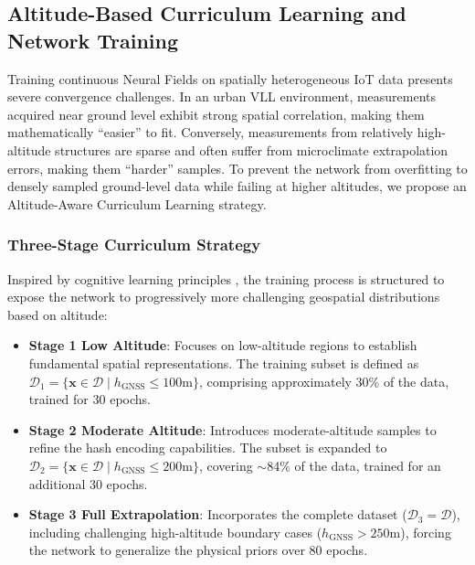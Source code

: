 \subsection{Altitude-Based Curriculum Learning and Network Training}
\label{subsec:curriculum_learning}
Training continuous Neural Fields on spatially heterogeneous IoT data presents severe convergence challenges. 
In an urban VLL environment, measurements acquired near ground level exhibit strong spatial correlation, making them mathematically ``easier'' to fit. 
Conversely, measurements from relatively high-altitude structures are sparse and often suffer from microclimate extrapolation errors, making them ``harder'' samples. To prevent the network from overfitting to densely sampled ground-level data while failing at higher altitudes, we propose an Altitude-Aware Curriculum Learning strategy.

\subsubsection{Three-Stage Curriculum Strategy}
Inspired by cognitive learning principles \cite{bengio2009curriculum}, the training process is structured to expose the network to progressively more challenging geospatial distributions based on altitude:
\begin{itemize}
    \item \textbf{Stage 1 Low Altitude}: Focuses on low-altitude regions to establish fundamental spatial representations. The training subset is defined as $\mathcal{D}_1 = \{ \mathbf{x} \in \mathcal{D} \mid h_{\text{GNSS}} \le 100\text{m} \}$, comprising approximately 30\% of the data, trained for 30 epochs.
    \item \textbf{Stage 2 Moderate Altitude}: Introduces moderate-altitude samples to refine the hash encoding capabilities. The subset is expanded to $\mathcal{D}_2 = \{ \mathbf{x} \in \mathcal{D} \mid h_{\text{GNSS}} \le 200\text{m} \}$, covering $\sim$84\% of the data, trained for an additional 30 epochs.
    \item \textbf{Stage 3 Full Extrapolation}: Incorporates the complete dataset ($\mathcal{D}_3 = \mathcal{D}$), including challenging high-altitude boundary cases ($h_{\text{GNSS}} > 250$m), forcing the network to generalize the physical priors over 80 epochs.
\end{itemize}


